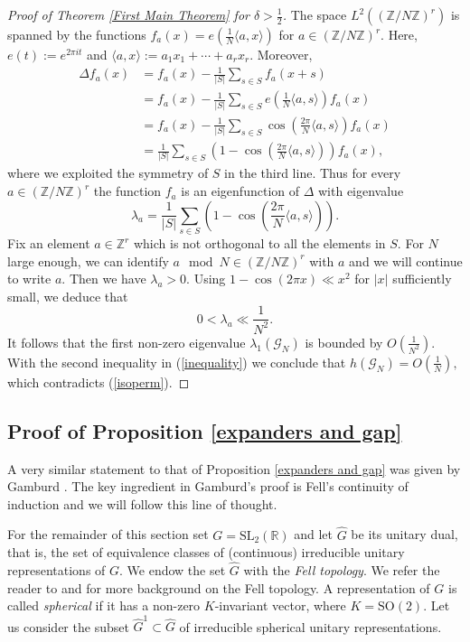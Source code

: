 \documentclass[12pt]{article}
\newcommand{\RR}{\mathbb{R}}
\newcommand{\ZZ}{\mathbb{Z}}
\newcommand{\SL}{\mathrm{SL}}
\begin{document}
\begin{proof}[Proof of Theorem \ref{First Main Theorem} for $ \delta > \frac{1}{2} $]
The space $ L^{2}\left( (\ZZ/N\ZZ)^{r} \right) $ is spanned by the functions $ f_{a}(x)=e\left( \frac{1}{N}\langle a, x\rangle \right) $ for $ a\in (\ZZ/N\ZZ)^{r} $. Here, $ e(t):=e^{2\pi it} $ and $ \langle a, x\rangle := a_{1}x_{1} + \cdots + a_{r}x_{r}. $
Moreover,
\begin{align*}
\Delta f_{a}(x) &=  f_{a}(x) - \frac{1}{\vert S\vert}\sum_{s\in S} f_{a}(x+s)\\
&= f_{a}(x) - \frac{1}{\vert S\vert}\sum_{s\in S} e\left( \frac{1}{N}\langle a, s\rangle\right) f_{a}(x)\\
&= f_{a}(x) - \frac{1}{\vert S\vert} \sum_{s\in S} \cos\left( \frac{2\pi}{N} \langle a, s\rangle \right) f_{a}(x)\\
&= \frac{1}{\vert S\vert} \sum_{s\in S} \left( 1- \cos\left( \frac{2\pi}{N} \langle a, s\rangle \right)\right) f_{a}(x),
\end{align*}
where we exploited the symmetry of $ S $ in the third line. Thus for every $ a\in (\ZZ/N\ZZ)^{r}  $ the function $ f_{a} $ is an eigenfunction of $ \Delta $ with eigenvalue
$$ \lambda_{a} = \frac{1}{\vert S\vert} \sum_{s\in S} \left( 1- \cos\left( \frac{2\pi}{N} \langle a, s\rangle \right)\right). $$
Fix an element $ a \in \ZZ^{r} $ which is not orthogonal to all the elements in $ S $. For $ N $ large enough, we can identify $ a \mod N \in (\ZZ/N\ZZ)^{r} $ with $ a $ and we will continue to write $ a $. Then we have $ \lambda_{a} > 0 $. 
Using $ 1-\cos(2\pi x) \ll x^{2} $ for $ \vert x\vert $ sufficiently small, we deduce that
$$ 0<\lambda_{a}\ll \frac{1}{N^{2}}.  $$
It follows that the first non-zero eigenvalue $ \lambda_{1}(\mathcal{G}_{N}) $ is bounded by $ O(\frac{1}{N^{2}}) $. With the second inequality in (\ref{inequality}) we conclude that $ h(\mathcal{G}_{N}) = O(\frac{1}{N}), $ which contradicts (\ref{isoperm}).
\end{proof}

\subsection{Proof of Proposition \ref{expanders and gap}}

A very similar statement to that of Proposition \ref{expanders and gap} was given by Gamburd \cite[Section~7]{Gamburd}. The key ingredient in Gamburd's proof is Fell's continuity of induction and we will follow this line of thought. 

For the remainder of this section set $ G = \SL_{2}(\RR) $ and let $ \hat{G} $ be its unitary dual, that is, the set of equivalence classes of (continuous) irreducible unitary representations of $ G $. We endow the set $ \hat{G} $ with the \textit{Fell topology}. We refer the reader to \cite{fell} and  \cite[Chapter~F]{Property(T)} for more background on the Fell topology. A representation of $ G $ is called \textit{spherical} if it has a non-zero $ K $-invariant vector, where $ K = \mathrm{SO}(2) $. Let us consider the subset $ \hat{G}^{1} \subset \hat{G} $ of irreducible spherical unitary representations. 
\end{document}
